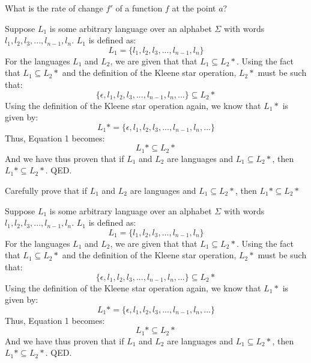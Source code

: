 \documentclass[11pt,letterpaper,boxed]{hmcpset}
\begin{document}
\begin{problem}[1]
What is the rate of change $f'$ of a function $f$ at the point $a$?
\end{problem}
\begin{solution}
Suppose $L_1$ is some arbitrary language over an alphabet $\Sigma$ with words $l_1,l_2,l_3,...,l_{n-1},l_{n}$. $L_1$ is defined as:
$$ L_1 = \{l_1, l_2, l_3,...,l_{n-1}, l_{n}\} $$
For the languages $L_1$ and $L_2$, we are given that that $L_1 \subseteq L_2*$. Using the fact that $L_1 \subseteq L_2*$ and the definition of the Kleene star operation, $L_2*$ must be such that:
$$ \{\epsilon, l_1, l_2, l_3,...,l_{n-1}, l_{n},...\} \subseteq L_2* $$
Using the definition of the Kleene star operation again, we know that $L_1*$ is given by:
$$ L_1* =  \{\epsilon, l_1, l_2, l_3,...,l_{n-1}, l_{n},...\} $$
Thus, Equation 1 becomes:
$$ L_1* \subseteq L_2* $$
And we have thus proven that if $L_1$ and $L_2$ are languages and $L_1 \subseteq L_2*$, then $L_1 * \subseteq L_2*$. QED.
\end{solution}
\pagebreak
\begin{problem}[2]
Carefully prove that if $L_1$ and $L_2$ are languages and $L_1 \subseteq L_2*$, then $L_1 * \subseteq L_2*$
\end{problem}
\begin{solution}
Suppose $L_1$ is some arbitrary language over an alphabet $\Sigma$ with words $l_1,l_2,l_3,...,l_{n-1},l_{n}$. $L_1$ is defined as:
$$ L_1 = \{l_1, l_2, l_3,...,l_{n-1}, l_{n}\} $$
For the languages $L_1$ and $L_2$, we are given that that $L_1 \subseteq L_2*$. Using the fact that $L_1 \subseteq L_2*$ and the definition of the Kleene star operation, $L_2*$ must be such that:
$$ \{\epsilon, l_1, l_2, l_3,...,l_{n-1}, l_{n},...\} \subseteq L_2* $$
Using the definition of the Kleene star operation again, we know that $L_1*$ is given by:
$$ L_1* =  \{\epsilon, l_1, l_2, l_3,...,l_{n-1}, l_{n},...\} $$
Thus, Equation 1 becomes:
$$ L_1* \subseteq L_2* $$
And we have thus proven that if $L_1$ and $L_2$ are languages and $L_1 \subseteq L_2*$, then $L_1 * \subseteq L_2*$. QED.
\end{solution}
\end{document}
